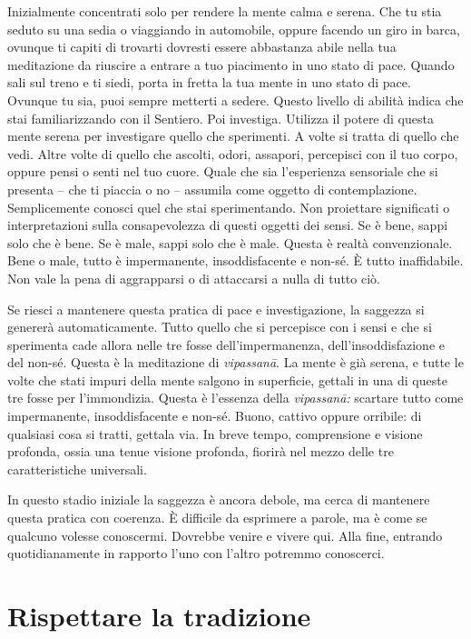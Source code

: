 Inizialmente concentrati solo per rendere la mente calma e serena. Che
tu stia seduto su una sedia o viaggiando in automobile, oppure facendo
un giro in barca, ovunque ti capiti di trovarti dovresti essere
abbastanza abile nella tua meditazione da riuscire a entrare a tuo
piacimento in uno stato di pace. Quando sali sul treno e ti siedi, porta
in fretta la tua mente in uno stato di pace. Ovunque tu sia, puoi sempre
metterti a sedere. Questo livello di abilità indica che stai
familiarizzando con il Sentiero. Poi investiga. Utilizza il potere di
questa mente serena per investigare quello che sperimenti. A volte si
tratta di quello che vedi. Altre volte di quello che ascolti, odori,
assapori, percepisci con il tuo corpo, oppure pensi o senti nel tuo
cuore. Quale che sia l'esperienza sensoriale che si presenta -- che ti
piaccia o no -- assumila come oggetto di contemplazione. Semplicemente
conosci quel che stai sperimentando. Non proiettare significati o
interpretazioni sulla consapevolezza di questi oggetti dei sensi. Se è
bene, sappi solo che è bene. Se è male, sappi solo che è male. Questa è
realtà convenzionale. Bene o male, tutto è impermanente, insoddisfacente
e non-sé. È tutto inaffidabile. Non vale la pena di aggrapparsi o di
attaccarsi a nulla di tutto ciò.

Se riesci a mantenere questa pratica di pace e investigazione, la
saggezza si genererà automaticamente. Tutto quello che si percepisce con
i sensi e che si sperimenta cade allora nelle tre fosse
dell'impermanenza, dell'insoddisfazione e del non-sé. Questa è la
meditazione di \emph{vipassanā}. La mente è già serena, e tutte le volte
che stati impuri della mente salgono in superficie, gettali in una di
queste tre fosse per l'immondizia. Questa è l'essenza della
\emph{vipassanā:} scartare tutto come impermanente, insoddisfacente e
non-sé. Buono, cattivo oppure orribile: di qualsiasi cosa si tratti,
gettala via. In breve tempo, comprensione e visione profonda, ossia una
tenue visione profonda, fiorirà nel mezzo delle tre caratteristiche
universali.

In questo stadio iniziale la saggezza è ancora debole, ma cerca di
mantenere questa pratica con coerenza. È difficile da esprimere a
parole, ma è come se qualcuno volesse conoscermi. Dovrebbe venire e
vivere qui. Alla fine, entrando quotidianamente in rapporto l'uno con
l'altro potremmo conoscerci.

\section{Rispettare la tradizione}

